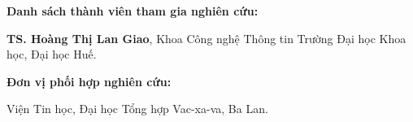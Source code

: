 \vspace{2ex}
\textbf{Danh sách thành viên tham gia nghiên cứu:}

\vspace{0.5ex}
\textbf{TS. Hoàng Thị Lan Giao}, Khoa Công nghệ Thông tin Trường Đại học Khoa học, Đại học Huế.

\vspace{2ex}
\textbf{Đơn vị phối hợp nghiên cứu:}

\vspace{0.5ex}
Viện Tin học, Đại học Tổng hợp Vac-xa-va, Ba Lan.

\tableofcontents

\cleardoublepage
{}
\listoffigures

\cleardoublepage
{}
\listoftables
\newpage